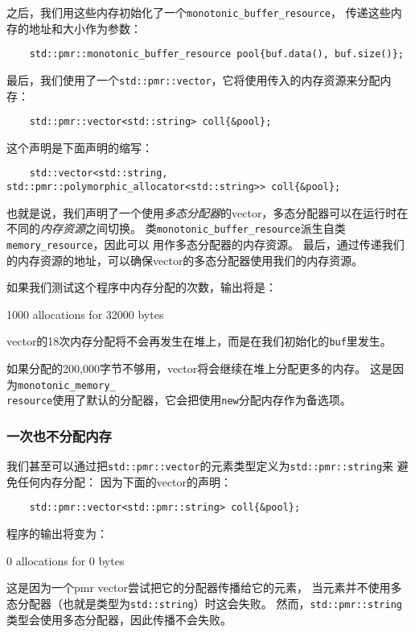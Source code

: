 之后，我们用这些内存初始化了一个\texttt{monotonic\_buffer\_resource}，
传递这些内存的地址和大小作为参数：
\begin{lstlisting}
    std::pmr::monotonic_buffer_resource pool{buf.data(), buf.size()};
\end{lstlisting}
最后，我们使用了一个\texttt{std::pmr::vector}，它将使用传入的内存资源来分配内存：
\begin{lstlisting}
    std::pmr::vector<std::string> coll{&pool};
\end{lstlisting}
这个声明是下面声明的缩写：
\begin{lstlisting}
    std::vector<std::string, std::pmr::polymorphic_allocator<std::string>> coll{&pool};
\end{lstlisting}
也就是说，我们声明了一个使用\emph{多态分配器}的vector，多态分配器可以在运行时在不同的\emph{内存资源}之间切换。
类\texttt{monotonic\_buffer\_resource}派生自类\texttt{memory\_resource}，因此可以
用作多态分配器的内存资源。
最后，通过传递我们的内存资源的地址，可以确保vector的多态分配器使用我们的内存资源。

如果我们测试这个程序中内存分配的次数，输出将是：
\begin{blacklisting}
    1000 allocations for 32000 bytes
\end{blacklisting}
vector的18次内存分配将不会再发生在堆上，而是在我们初始化的\texttt{buf}里发生。

如果分配的200,000字节不够用，vector将会继续在堆上分配更多的内存。
这是因为\texttt{monotonic\_memory\_\\
resource}使用了默认的分配器，它会把使用\texttt{new}分配内存作为备选项。

\subsubsection{一次也不分配内存}
我们甚至可以通过把\texttt{std::pmr::vector}的元素类型定义为\texttt{std::pmr::string}来
避免任何内存分配：
因为下面的vector的声明：
\begin{lstlisting}
    std::pmr::vector<std::pmr::string> coll{&pool};
\end{lstlisting}
程序的输出将变为：
\begin{blacklisting}
    0 allocations for 0 bytes
\end{blacklisting}
这是因为一个pmr vector尝试把它的分配器传播给它的元素，
当元素并不使用多态分配器（也就是类型为\texttt{std::string}）时这会失败。
然而，\texttt{std::pmr::string}类型会使用多态分配器，因此传播不会失败。

